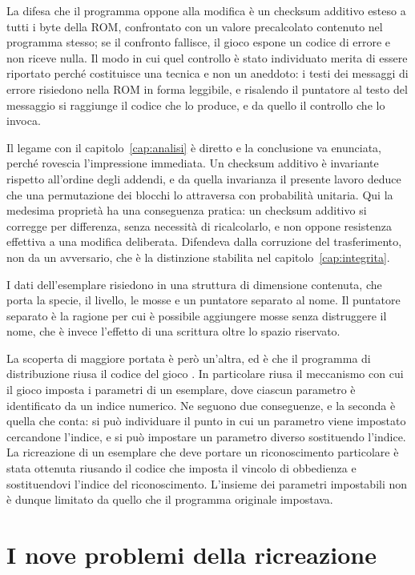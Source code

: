 La difesa che il programma oppone alla modifica è un checksum additivo esteso a tutti i byte della ROM, confrontato con un valore precalcolato contenuto nel programma stesso; se il confronto fallisce, il gioco espone un codice di errore e non riceve nulla. Il modo in cui quel controllo è stato individuato merita di essere riportato perché costituisce una tecnica e non un aneddoto: i testi dei messaggi di errore risiedono nella ROM in forma leggibile, e risalendo il puntatore al testo del messaggio si raggiunge il codice che lo produce, e da quello il controllo che lo invoca.

Il legame con il capitolo~\ref{cap:analisi} è diretto e la conclusione va enunciata, perché rovescia l'impressione immediata. Un checksum additivo è invariante rispetto all'ordine degli addendi, e da quella invarianza il presente lavoro deduce che una permutazione dei blocchi lo attraversa con probabilità unitaria. Qui la medesima proprietà ha una conseguenza pratica: un checksum additivo si corregge per differenza, senza necessità di ricalcolarlo, e non oppone resistenza effettiva a una modifica deliberata. Difendeva dalla corruzione del trasferimento, non da un avversario, che è la distinzione stabilita nel capitolo~\ref{cap:integrita}.

I dati dell'esemplare risiedono in una struttura di dimensione contenuta, che porta la specie, il livello, le mosse e un puntatore separato al nome. Il puntatore separato è la ragione per cui è possibile aggiungere mosse senza distruggere il nome, che è invece l'effetto di una scrittura oltre lo spazio riservato.

La scoperta di maggiore portata è però un'altra, ed è che il programma di distribuzione riusa il codice del gioco \cite{video-distribuzioni}. In particolare riusa il meccanismo con cui il gioco imposta i parametri di un esemplare, dove ciascun parametro è identificato da un indice numerico. Ne seguono due conseguenze, e la seconda è quella che conta: si può individuare il punto in cui un parametro viene impostato cercandone l'indice, e si può impostare un parametro diverso sostituendo l'indice. La ricreazione di un esemplare che deve portare un riconoscimento particolare è stata ottenuta riusando il codice che imposta il vincolo di obbedienza e sostituendovi l'indice del riconoscimento. L'insieme dei parametri impostabili non è dunque limitato da quello che il programma originale impostava.

\section{I nove problemi della ricreazione}

